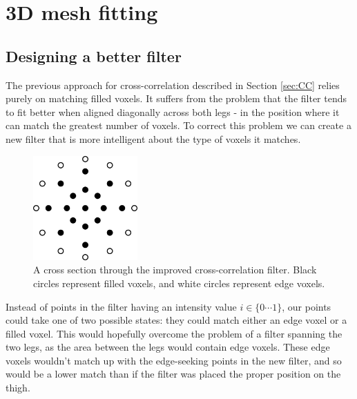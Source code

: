 \section{3D mesh fitting}

\subsection{Designing a better filter}

The previous approach for cross-correlation described in Section \ref{sec:CC} relies purely on matching filled voxels.
It suffers from the problem that the filter tends to fit better when aligned diagonally across both legs - in the position where it can match the greatest number of voxels.
To correct this problem we can create a new filter that is more intelligent about the type of voxels it matches.

\begin{figure}[b]
	\centering
	\includegraphics[width=4cm]{../interim/improvedfilter.png}
	\caption{A cross section through the improved cross-correlation filter.
		Black circles represent filled voxels, and white circles represent edge voxels.}
	\label{ImprovedFilterCross}
\end{figure}

Instead of points in the filter having an intensity value $i \in \{0 \cdots 1\}$, our points could take one of two possible states: they could match either an edge voxel or a filled voxel.
This would hopefully overcome the problem of a filter spanning the two legs, as the area between the legs would contain edge voxels.
These edge voxels wouldn't match up with the edge-seeking points in the new filter, and so would be a lower match than if the filter was placed the proper position on the thigh.


